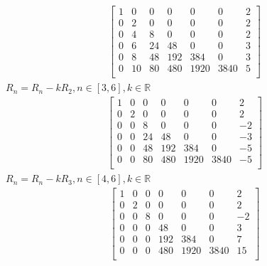 \documentclass{article}
\begin{document}
{\begin{equation*}
\begin{split}
                        \begin{bmatrix}
                            1&0&0&0&0&0&2\\
                            0&2&0&0&0&0&2\\
                            0&4&8&0&0&0&2\\
                            0&6&24&48&0&0&3\\
                            0&8&48&192&384&0&3\\
                            0&10&80&480&1920&3840&5\\
                        \end{bmatrix}
                    \end{split}
                \end{equation*}
                $R_n=R_n-kR_2,n\in[3,6],k\in \mathbb{R}$
                \begin{equation*}
                    \begin{split}
                        \begin{bmatrix}
                            1&0&0&0&0&0&2\\
                            0&2&0&0&0&0&2\\
                            0&0&8&0&0&0&-2\\
                            0&0&24&48&0&0&-3\\
                            0&0&48&192&384&0&-5\\
                            0&0&80&480&1920&3840&-5\\
                        \end{bmatrix}
                    \end{split}
                \end{equation*}
                $R_n=R_n-kR_3,n\in[4,6],k\in \mathbb{R}$
                \begin{equation*}
                    \begin{split}
                        \begin{bmatrix}
                            1&0&0&0&0&0&2\\
                            0&2&0&0&0&0&2\\
                            0&0&8&0&0&0&-2\\
                            0&0&0&48&0&0&3\\
                            0&0&0&192&384&0&7\\
                            0&0&0&480&1920&3840&15\\

\end{bmatrix}
\end{split}
\end{equation*}}
\end{document}

